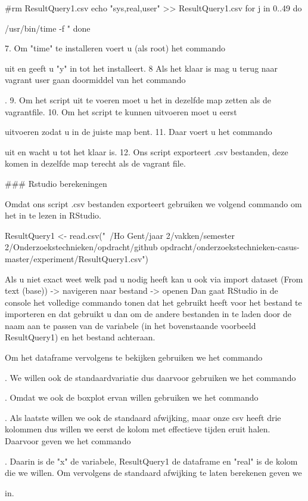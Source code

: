 \documentclass[fleqn,10pt]{artikeltin}
\begin{document}
#rm ResultQuery1.csv
echo "sys,real,user" >> ResultQuery1.csv
for j in {0..49}
do
{ /usr/bin/time -f "%
done 

7. Om "time" te installeren voert u (als root) het commando \par uit en geeft u "y" in tot het installeert.
8 Als het klaar is mag u terug naar vagrant user gaan doormiddel van het commando \par . 
9. Om het script uit te voeren moet u het in dezelfde map zetten als de vagrantfile.
10. Om het script te kunnen uitvoeren moet u eerst \par uitvoeren zodat u in de juiste map bent.
11. Daar voert u het commando \par uit en wacht u tot het klaar is.
12. Ons script exporteert .csv bestanden, deze komen in dezelfde map terecht als de vagrant file.

### Rstudio berekeningen

Omdat ons script .csv bestanden exporteert gebruiken we volgend commando om het in te lezen in RStudio.

ResultQuery1 <- read.csv("~/Ho Gent/jaar 2/vakken/semester 2/Onderzoekstechnieken/opdracht/github opdracht/onderzoekstechnieken-casus-master/experiment/ResultQuery1.csv")

Als u niet exact weet welk pad u nodig heeft kan u ook via import dataset (From text (base)) -> navigeren naar bestand -> openen
Dan gaat RStudio in de console het volledige commando tonen dat het gebruikt heeft voor het bestand te importeren en dat gebruikt u dan om de andere bestanden in te laden door de naam aan te passen van de variabele (in het bovenstaande voorbeeld ResultQuery1) en het bestand achteraan.

Om het dataframe vervolgens te bekijken gebruiken we het commando \par.
We willen ook de standaardvariatie dus daarvoor gebruiken we het commando \par.
Omdat we ook de boxplot ervan willen gebruiken we het commando \par.
Als laatste willen we ook de standaard afwijking, maar onze csv heeft drie kolommen dus willen we eerst de kolom met effectieve tijden eruit halen. Daarvoor geven we het commando \par. Daarin is de "x" de variabele, ResultQuery1 de dataframe en "real" is de kolom die we willen.
Om vervolgens de standaard afwijking te laten berekenen geven we \par in.

}
\end{document}

